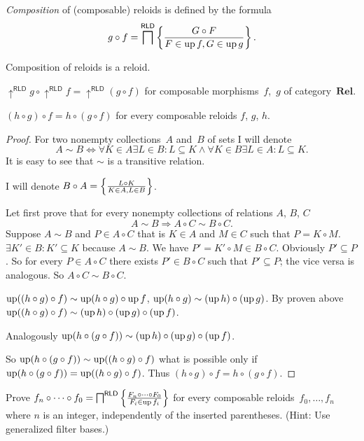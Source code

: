 \begin{defn}
\emph{Composition} of (composable)
reloids is defined by the formula
\[
g\circ f=\bigsqcap^{\mathsf{RLD}}\left\{ \frac{G\circ F}{F\in\operatorname{up} f,G\in\operatorname{up} g}\right\}.
\]
\end{defn}
\begin{obvious}
Composition of reloids is a reloid.
\end{obvious}

\begin{obvious}
$\uparrow^{\mathsf{RLD}}g\circ\uparrow^{\mathsf{RLD}}f=\uparrow^{\mathsf{RLD}}(g\circ f)$
for composable morphisms~$f$,~$g$ of category~$\mathbf{Rel}$.\end{obvious}
\begin{thm}
$(h\circ g)\circ f=h\circ(g\circ f)$ for every composable reloids
$f$, $g$, $h$.\end{thm}
\begin{proof}
For two nonempty collections~$A$ and~$B$ of sets I will denote
\[
A\sim B\Leftrightarrow\forall K\in A\exists L\in B:L\subseteq K\wedge\forall K\in B\exists L\in A:L\subseteq K.
\]
It is easy to see that $\sim$ is a transitive relation.

I will denote $B\circ A=\left\{ \frac{L\circ K}{K\in A,L\in B}\right\}$.

Let first prove that for every nonempty collections of relations $A$,
$B$, $C$
\[
A\sim B\Rightarrow A\circ C\sim B\circ C.
\]
Suppose $A\sim B$ and $P\in A\circ C$ that is $K\in A$ and $M\in C$
such that $P=K\circ M$. $\exists K'\in B:K'\subseteq K$ because
$A\sim B$. We have $P'=K'\circ M\in B\circ C$. Obviously $P'\subseteq P$.
So for every $P\in A\circ C$ there exists $P'\in B\circ C$ such
that $P'\subseteq P$; the vice versa is analogous. So $A\circ C\sim B\circ C$.

$\operatorname{up}((h\circ g)\circ f)\sim\operatorname{up}(h\circ g)\circ\operatorname{up} f$, $\operatorname{up}(h\circ g)\sim(\operatorname{up} h)\circ(\operatorname{up} g)$.
By proven above $\operatorname{up}((h\circ g)\circ f)\sim(\operatorname{up} h)\circ(\operatorname{up} g)\circ(\operatorname{up} f)$.

Analogously $\operatorname{up}(h\circ(g\circ f))\sim(\operatorname{up} h)\circ(\operatorname{up} g)\circ(\operatorname{up} f)$.

So $\operatorname{up}(h\circ(g\circ f))\sim\operatorname{up}((h\circ g)\circ f)$ what is possible
only if $\operatorname{up}(h\circ(g\circ f))=\operatorname{up}((h\circ g)\circ f)$. Thus $(h\circ g)\circ f=h\circ(g\circ f)$.\end{proof}
\begin{xca}
Prove $f_n\circ\dots\circ f_0 = \bigsqcap^{\mathsf{RLD}}\left\{ \frac{F_n\circ\dots\circ F_0}{F_i\in\operatorname{up} f_i}\right\}$
for every composable reloids~$f_0,\dots,f_n$ where $n$ is an integer, independently of the inserted parentheses.
(Hint: Use generalized filter bases.)
\end{xca}
